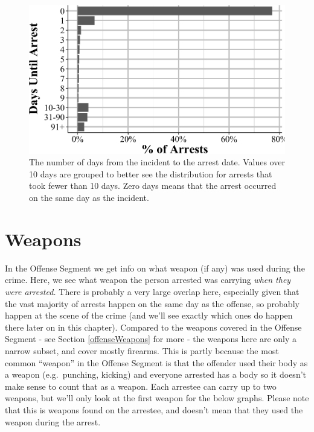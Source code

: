 \documentclass[
  12pt,
  openany]{book}
\begin{document}
\begin{figure}

{\centering \includegraphics[width=0.9\linewidth]{16_nibrs_arrestee_files/figure-latex/arrestsDaysUntilArrestBarplot-1} 

}

\caption{The number of days from the incident to the arrest date. Values over 10 days are grouped to better see the distribution for arrests that took fewer than 10 days. Zero days means that the arrest occurred on the same day as the incident.}\label{fig:arrestsDaysUntilArrestBarplot}
\end{figure}

\section{Weapons}\label{weapons}

In the Offense Segment we get info on what weapon (if any) was used during the crime. Here, we see what weapon the person arrested was carrying \emph{when they were arrested.} There is probably a very large overlap here, especially given that the vast majority of arrests happen on the same day as the offense, so probably happen at the scene of the crime (and we'll see exactly which ones do happen there later on in this chapter). Compared to the weapons covered in the Offense Segment - see Section \ref{offenseWeapons} for more - the weapons here are only a narrow subset, and cover mostly firearms. This is partly because the most common ``weapon'' in the Offense Segment is that the offender used their body as a weapon (e.g.~punching, kicking) and everyone arrested has a body so it doesn't make sense to count that as a weapon. Each arrestee can carry up to two weapons, but we'll only look at the first weapon for the below graphs. Please note that this is weapons found on the arrestee, and doesn't mean that they used the weapon during the arrest.
\end{document}
